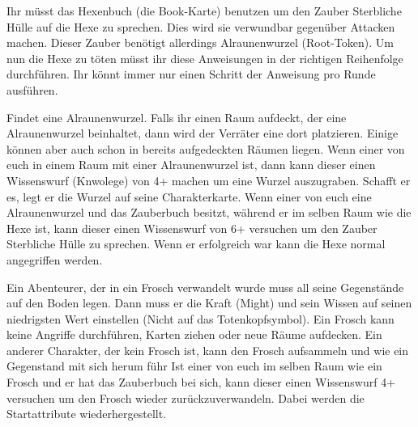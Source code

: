 






Ihr müsst das Hexenbuch (die Book-Karte) benutzen um den Zauber Sterbliche Hülle auf die Hexe zu sprechen. Dies wird sie verwundbar gegenüber Attacken machen. Dieser Zauber benötigt allerdings Alraunenwurzel (Root-Token).
Um nun die Hexe zu töten müsst ihr diese Anweisungen in der richtigen Reihenfolge durchführen. Ihr könnt immer nur einen Schritt der Anweisung pro Runde ausführen.

  \begin{itemize}
        \bitem Findet eine Alraunenwurzel. Falls ihr einen Raum aufdeckt, der eine Alraunenwurzel
beinhaltet, dann wird der Verräter eine dort platzieren. Einige können aber auch schon
in bereits aufgedeckten Räumen liegen.
        \bitem Wenn einer von euch in einem Raum mit einer Alraunenwurzel ist, dann kann dieser einen Wissenswurf (Knwolege) von 4+ machen um eine Wurzel auszugraben. Schafft
er es, legt er die Wurzel auf seine Charakterkarte.
        \bitem Wenn einer von euch eine Alraunenwurzel und das Zauberbuch besitzt, während er im
selben Raum wie die Hexe ist, kann dieser einen Wissenswurf von 6+ versuchen um den Zauber Sterbliche Hülle zu sprechen. Wenn er erfolgreich war kann die Hexe normal angegriffen werden.
    \end{itemize}
\newpage
{}

  \begin{itemize}
        \bitem Ein Abenteurer, der in ein Frosch verwandelt wurde muss all seine Gegenstände auf den Boden legen. Dann muss er die Kraft (Might) und sein Wissen auf seinen niedrigsten Wert einstellen (Nicht auf das Totenkopfsymbol). Ein Frosch kann keine Angriffe durchführen, Karten ziehen oder neue Räume aufdecken. Ein anderer Charakter, der kein Frosch ist, kann den Frosch aufsammeln und wie ein Gegenstand mit sich herum führ
        \bitem Ist einer von euch im selben Raum wie ein Frosch und er hat das Zauberbuch bei sich, kann dieser einen Wissenswurf 4+ versuchen um den Frosch wieder zurückzuverwandeln. Dabei werden die Startattribute wiederhergestellt.
    \end{itemize}

